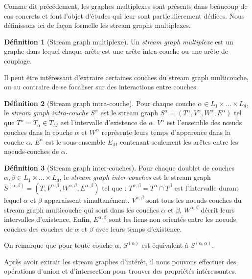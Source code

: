 \documentclass[11pt,a4paper]{article}
\theoremstyle{definition}
\newtheorem{defn}{Définition}
\theoremstyle{remark}
\theoremstyle{remark}
\def \stgm {stream graph multicouche}
\begin{document}
	
	Comme dit précédement, les graphes multiplexes sont présents dans beaucoup de cas concrets et font l'objet d'études qui leur sont particulièrement dédiées. Nous définissons ici de façon formelle les stream graphs multiplexes.
	
	\begin{defn}[Stream graph multiplexe]	
	Un {\em stream graph multiplexe} est un graphe dans lequel chaque arête est une arête intra-couche ou une arête de couplage.
	\end{defn}
	
	Il peut être intéressant d'extraire certaines couches du \stgm{}, ou au contraire de se focaliser sur des interactions entre couches.
	 
	\begin{defn}[Stream graph intra-couche]
	Pour chaque couche $\alpha \in L_1 \times \dots \times L_d$, le {\em stream graph intra-couche} $S^{\alpha}$ est le stream graph $S^{\alpha}=(T^{\alpha},V^{\alpha},W^{\alpha},E^{\alpha})$ tel que $T^{\alpha} = T_{\alpha} \in T_M$ est l'intervalle d'existence de $\alpha$. $V^{\alpha}$ est l'ensemble des nœuds couches dans la couche $\alpha$ et $W^{\alpha}$ représente leurs temps d'apparence dans la couche $\alpha$. $E^{\alpha}$ est le sous-ensemble $E_M$ contenant seulement les arêtes entre les noeuds-couches de $\alpha$.
	\end{defn}
	
	
	\begin{defn}[Stream graph inter-couches]	
	Pour chaque doublet de couches $\alpha, \beta \in L_1\times \dots\times L_d$, le {\em stream graph inter-couches} est le stream graph $S^{(\alpha,\beta)} = (T, V^{\alpha,\beta},W^{\alpha,\beta},E^{\alpha,\beta})$ tel que : $T^{\alpha,\beta}=T^{\alpha}\cap T^{\beta}$ est l'intervalle durant lequel $\alpha$ et $\beta$ apparaissent simultanément. $V^{\alpha,\beta}$ sont tous les noeuds-couches du stream graph multicouche qui sont dans les couches $\alpha$ et $\beta$, $W^{\alpha,\beta}$ décrit leurs intervalles d'existence. Enfin, $E^{\alpha,\beta}$ sont les liens non orientés entre les noeuds couches des couches de $\alpha$ et $\beta$ avec leurs temps d'existence.
	\end{defn}
	

	On remarque que pour toute couche $\alpha$, $S^{(\alpha)}$ est équivalent à $S^{(\alpha,\alpha)}$.


	Après avoir extrait les stream graphes d'intérêt, il nous pouvons effectuer des opérations d'union et d'intersection pour trouver des propriétés intéressantes.
	
\end{document}
